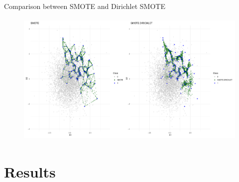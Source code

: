 \documentclass{beamer}
\begin{document}
\begin{frame}{Comparison between SMOTE and Dirichlet SMOTE}
\begin{figure}
  \centering
  \includegraphics[width=\linewidth, height = 6.5cm]{images/combined.pdf}
  \label{fig:label3}
\end{figure}   
\end{frame}



\section{Results}
\end{document}
